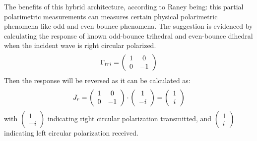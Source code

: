 The benefits of this hybrid architecture, according to Raney being:
	this partial polarimetric measurements can measures certain physical polarimetric phenomena like odd and even bounce phenomena.
The suggestion is evidenced by calculating the response of known odd-bounce trihedral and even-bounce dihedral when the incident wave is right circular polarized.
\begin{equation}
\Gamma_{tri} = \left(
\begin{array}{c c}
1 & 0 \\
0 & -1
\end{array}
\right)
\end{equation}
Then the response will be reversed as it can be calculated as:
\begin{equation}
J_r = \left(
\begin{array}{c c}
1 & 0 \\
0 & -1
\end{array}
\right) \cdot
\left(
\begin{array}{c}
1 \\
-i
\end{array}
\right) = \left(
\begin{array}{c}
1 \\
i
\end{array}
\right) 
\end{equation}
with
	$ \left( \begin{array}{c} 1 \\ -i \end{array} \right) $ indicating right circular polarization transmitted, and
	$ \left( \begin{array}{c} 1 \\ i \end{array} \right) $ indicating left circular polarization received.

